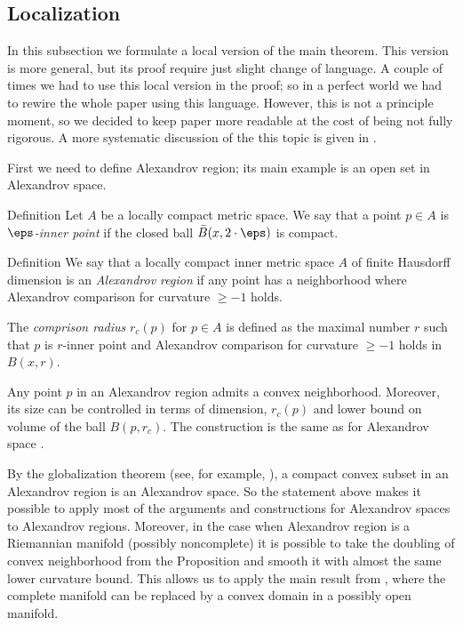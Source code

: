 \subsection{Localization}\label{sec:local}

In this subsection we formulate a local version of the main theorem.
This version is more general, but its proof require just slight change of language.
A couple of times we had to use this local version in the proof;
so in a perfect world we had to rewire the whole paper using this language.
However, this is not a principle moment,
so we decided to keep paper more readable at the cost of being not fully rigorous.
A more systematic discussion of the this topic is given in \cite{LNep}.

First we need to define Alexandrov region;
its main example is an open set in Alexandrov space.

\begin{thm}{Definition}
Let $A$ be a locally compact metric space. 
We say that a point  $p\in A$
is  \emph{ $\eps$-inner point} if
the closed ball $\bar B(x,2\cdot\eps)$ is compact.
\end{thm}

\begin{thm}{Definition}
We say that a locally compact inner metric space $A$ of finite Hausdorff dimension
is an \emph{Alexandrov region} if
any point has a neighborhood where Alexandrov
comparison for curvature $\ge -1$ holds.

The \emph{comprison radius} $r_c(p)$ for $p\in A$ is defined as 
the maximal number $r$ such that
$p$ is $r$-inner point and Alexandrov
comparison for curvature $\ge -1$ holds in
$B(x,r)$.
\end{thm}

Any point $p$ in an Alexandrov region admits a convex neighborhood.
Moreover, its size can be controlled in terms of dimension, $r_c(p)$ and lower bound on volume of the ball $B(p,r_c)$.
The construction is the same as for Alexandrov space \cite[4.3]{perelman-petrunin}.

By the globalization theorem (see, for example, \cite{AKP}), a compact convex subset in an Alexandrov region is an Alexandrov space.
So the statement above makes it possible to apply most of the arguments and constructions for Alexandrov spaces to Alexandrov regions. 
Moreover, in the case when Alexandrov region is a Riemannian manifold (possibly noncomplete) it is possible to take the doubling of convex neighborhood from the Proposition
and smooth it with almost the same lower curvature bound.
This allows us to apply the main result from \cite{petrunin-SC}, where the complete manifold can be replaced by a convex domain in a possibly open manifold. 

